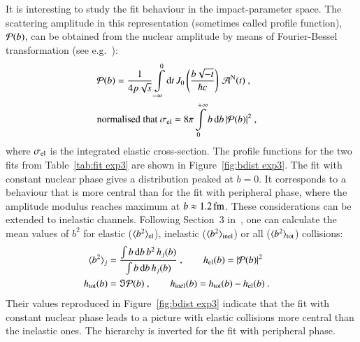 It is interesting to study the fit behaviour in the impact-parameter space. The scattering amplitude in this representation (sometimes called profile function), ${\cal P}(b)$, can be obtained from the nuclear amplitude by means of Fourier-Bessel transformation (see e.g.~\cite{klk02}):
\begin{equation}
\label{eq:prof fun}
	\begin{aligned}
		&{\cal P}(b) = {1\over 4 p \sqrt s} \int\limits_{-\infty}^0 \d t\,J_0\left(b\sqrt{-t}\over \hbar c\right)\,{\cal A}^{\rm N}(t)\ ,\cr
		&\hbox{normalised that } {\sigma_{\rm el} = 8\pi \int\limits_0^{+\infty} b\, \d b\, |{\cal P}(b)|^2}\ ,\cr
	\end{aligned}
\end{equation}
where $\sigma_{\rm el}$ is the integrated elastic cross-section. The profile functions for the two fits from Table~\ref{tab:fit exp3} are shown in Figure~\ref{fig:bdist exp3}. The fit with constant nuclear phase gives a distribution peaked at $b=0$. It corresponds to a behaviour that is more central than for the fit with peripheral phase, where the amplitude modulus reaches maximum at $b\approx 1.2\,{\rm fm}$. These considerations can be extended to inelastic channels. Following Section~3 in~\cite{klk02}, one can calculate the mean values of $b^2$ for elastic ($\langle b^2\rangle_{\rm el}$), inelastic ($\langle b^2\rangle_{\rm inel}$) or all ($\langle b^2\rangle_{\rm tot}$) collisions:
\begin{equation}
\label{eq:ms b}
	\begin{aligned}
		\langle b^2\rangle_j &= {
			\int b\,\d b\,b^2\, h_j(b)
			\over
			\int b\,\d b\, h_j(b)
		}\ ,\qquad h_{\rm el}(b) = |{\cal P}(b)|^2\cr
		h_{\rm tot}(b) &= \Im {\cal P}(b)\ ,\qquad
		h_{\rm inel}(b) = h_{\rm tot}(b) - h_{\rm el}(b)\ .\cr
	\end{aligned}
\end{equation}
Their values reproduced in Figure~\ref{fig:bdist exp3} indicate that the fit with constant nuclear phase leads to a picture with elastic collisions more central than the inelastic ones. The hierarchy is inverted for the fit with peripheral phase.



